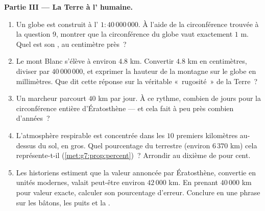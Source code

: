 \begin{problem}
\medskip
\noindent\textbf{Partie III --- La Terre à l' humaine.}
\begin{enumerate}[resume]
  \item Un globe est construit à l' $1 : 40\,000\,000$. À
        l'aide de la circonférence trouvée à la question 9, montrer
        que la circonférence du globe vaut exactement $1$ m. Quel est
        son , au centimètre près~?
  \item Le mont Blanc s'élève à environ $4.8$ km. Convertir $4.8$ km
        en centimètres, diviser par $40\,000\,000$, et exprimer la
        hauteur de la montagne sur le globe en millimètres. Que dit
        cette réponse sur la véritable «~rugosité~» de la Terre~?
  \item Un marcheur parcourt $40$ km par jour. À ce rythme, combien
        de jours pour la circonférence entière d'Ératosthène --- et
        cela fait à peu près combien d'années~?
  \item L'atmosphère respirable est concentrée dans les $10$
        premiers kilomètres au-dessus du sol, en gros. Quel
        pourcentage du  terrestre (environ $6\,370$ km) cela
        représente-t-il (\cref{met:g7:prop:percent})~? Arrondir au
        dixième de pour cent.
  \item Les historiens estiment que la valeur annoncée par
        Ératosthène, convertie en unités modernes, valait peut-être
        environ $42\,000$ km. En prenant $40\,000$ km pour valeur
        exacte, calculer son pourcentage d'erreur. Conclure en une
        phrase sur les bâtons, les puits et la .
\end{enumerate}
\end{problem}
